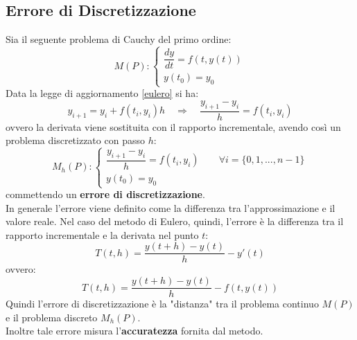 \subsection{Errore di Discretizzazione}
Sia il seguente problema di Cauchy del primo ordine:
\begin{equation*}
	M(P) :
	\begin{cases}
		\dfrac{dy}{dt} = f(t, y(t)) \\[0.2cm]
		y(t_{0}) = y_0
	\end{cases}
\end{equation*}
Data la legge di aggiornamento \ref{eulero} si ha:
\begin{equation*}
	y_{i+1} = y_i +f(t_i, y_i)h \quad \Rightarrow \quad \dfrac{y_{i+1}-y_i}{h} = f(t_i,y_i)
\end{equation*}
ovvero la derivata viene sostituita con il rapporto incrementale, avendo così un problema discretizzato con passo $h$:
\begin{equation}
	M_h(P) :
	\begin{cases}
		\dfrac{y_{i+1}-y_i}{h} = f(t_i,y_i) \qquad \forall i = \{0,1,...,n-1\} \\[0.2cm]
		y(t_{0}) = y_0
	\end{cases}
\end{equation}
commettendo un \textbf{errore di discretizzazione}.
\\In generale l'errore viene definito come la differenza tra l'approssimazione e il valore reale. Nel caso del metodo di Eulero, quindi, l'errore è la differenza tra il rapporto incrementale e la derivata nel punto $t$:
\begin{equation*}
	T(t,h) = \dfrac{y(t+h)-y(t)}{h} - y'(t)
\end{equation*}
ovvero:
\begin{equation}
	T(t,h) = \dfrac{y(t+h)-y(t)}{h} - f(t,y(t))
\end{equation}
Quindi l'errore di discretizzazione è la "distanza" tra il problema continuo $M(P)$ e il problema discreto $M_h(P)$.
\\Inoltre tale errore misura l'\textbf{accuratezza} fornita dal metodo.

